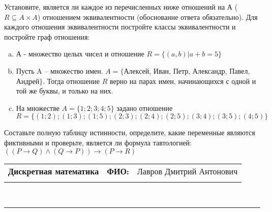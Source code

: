 \documentclass[10pt]{exam}
\newcommand{\class}{Дискретная математика}
\newcommand{\examdate}{}
\begin{document}
\begin{questions}
\question
Установите, является ли каждое из перечисленных ниже отношений на А ($R \subseteq A \times A$) отношением эквивалентности (обоснование ответа обязательно). Для каждого отношения эквивалентности постройте классы 
эквивалентности и постройте граф отношения:
\begin{enumerate} [a)]\setcounter{enumi}{0}
\item А - множество целых чисел и отношение $R = \{(a,b)|a + b = 5\}$
\item Пусть A – множество имен. $A = \{ $Алексей, Иван, Петр, Александр, Павел, Андрей$ \}$. Тогда отношение $R $ верно на парах имен, начинающихся с одной и той же буквы, и только на них.
\item На множестве $A = \{1; 2; 3; 4; 5\}$ задано отношение $R = \{(1; 2); (1; 3); (1; 5); (2; 3); (2; 4); (2; 5); (3; 4); (3; 5); (4; 5)\}$
\end{enumerate}\question Составьте полную таблицу истинности, определите, какие переменные являются фиктивными и проверьте, является ли формула тавтологией:
$(( P \rightarrow Q) \land (Q \rightarrow P)) \rightarrow (P \rightarrow R)$

\end{questions}
\newpage
\begin{flushright}
\begin{tabular}{p{2.8in} r l}
\textbf{\class} & \textbf{ФИО:} &Лавров Дмитрий Антонович
\\

\textbf{\examdate} &&\\
\end{tabular}\\
\end{flushright}
\rule[1ex]{\textwidth}{.1pt}
\end{document}
